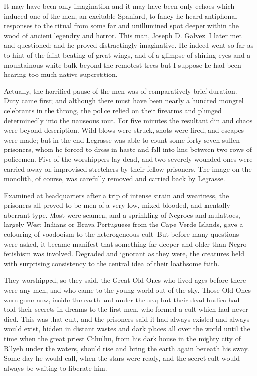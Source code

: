 It may have been only imagination and it may have been only echoes which
induced one of the men, an excitable Spaniard, to fancy he heard
antiphonal responses to the ritual from some far and unillumined spot
deeper within the wood of ancient legendry and horror. This man, Joseph
D. Galvez, I later met and questioned; and he proved distractingly
imaginative. He indeed went so far as to hint of the faint beating of
great wings, and of a glimpse of shining eyes and a mountainous white
bulk beyond the remotest trees but I suppose he had been hearing too
much native superstition.

\pagebreak

Actually, the horrified pause of the men was of comparatively brief
duration. Duty came first; and although there must have been nearly a
hundred mongrel celebrants in the throng, the police relied on their
firearms and plunged determinedly into the nauseous rout. For five
minutes the resultant din and chaos were beyond description. Wild blows
were struck, shots were fired, and escapes were made; but in the end
Legrasse was able to count some forty-seven sullen prisoners, whom he
forced to dress in haste and fall into line between two rows of
policemen. Five of the worshippers lay dead, and two severely wounded
ones were carried away on improvised stretchers by their
fellow-prisoners. The image on the monolith, of course, was carefully
removed and carried back by Legrasse.

Examined at headquarters after a trip of intense strain and weariness,
the prisoners all proved to be men of a very low, mixed-blooded, and
mentally aberrant type. Most were seamen, and a sprinkling of Negroes
and mulattoes, largely West Indians or Brava Portuguese from the Cape
Verde Islands, gave a colouring of voodooism to the heterogeneous cult.
But before many questions were asked, it became manifest that something
far deeper and older than Negro fetishism was involved. Degraded and
ignorant as they were, the creatures held with surprising consistency to
the central idea of their loathsome faith.

\pagebreak

They worshipped, so they said, the Great Old Ones who lived ages before
there were any men, and who came to the young world out of the sky.
Those Old Ones were gone now, inside the earth and under the sea; but
their dead bodies had told their secrets in dreams to the first men, who
formed a cult which had never died. This was that cult, and the
prisoners said it had always existed and always would exist, hidden in
distant wastes and dark places all over the world until the time when
the great priest Cthulhu, from his dark house in the mighty city of
R'lyeh under the waters, should rise and bring the earth again beneath
his sway. Some day he would call, when the stars were ready, and the
secret cult would always be waiting to liberate him.

